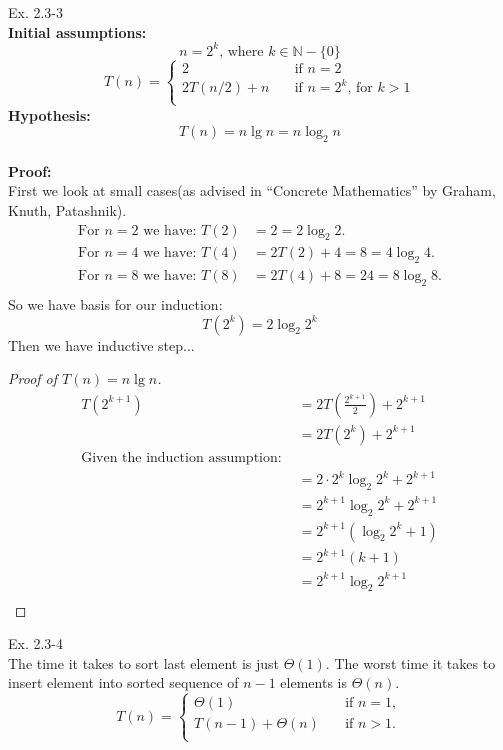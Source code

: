 \documentclass[a4paper,11pt]{exam}
\begin{document}
Ex. 2.3-3 \\
\textbf{Initial assumptions: }
\[
    n = 2^k \text{, where } k \in \mathbb{N} - \{ 0 \} 
\]
\[
    T(n) =
    \begin{cases}
        2               & \quad \text{if } n = 2 \\
        2T(n/2) + n     & \quad \text{if } n = 2^k \text{, for } k > 1 \\
    \end{cases}
\]
\textbf{Hypothesis: }
\[
    T(n) = n \lg n = n \log_2 n
\] \\
\textbf{Proof: } \\
First we look at small cases(as advised in ``Concrete Mathematics'' by  Graham, Knuth, Patashnik).
\[
    \begin{split}
        \text{For } n = 2 \text{ we have: } T(2) &= 2 = 2 \log_2 2. \\
        \text{For } n = 4 \text{ we have: } T(4) &= 2 T \left( 2 \right) + 4 = 8 = 4 \log_2 4. \\
        \text{For } n = 8 \text{ we have: } T(8) &= 2 T \left( 4 \right) + 8 = 24 = 8 \log_2 8. \\
    \end{split}
\]
So we have basis for our induction:
\[
    T \left( 2^k \right) = 2 \log_2 2^k
\]
Then we have inductive step...
\begin{proof}[Proof of \( T(n) = n \lg n \)]
    \[
        \begin{split}
            T(2^{k + 1}) & = 2 T \left( \frac{2^{k + 1}}{2} \right) + 2^{k + 1} \\
            & = 2 T \left( 2^k \right) + 2^{k + 1} \\
            \text{Given the induction assumption: } \\
            & = 2 \cdot 2^k \log_2 2^k + 2^{k + 1} \\
            & = 2^{k + 1} \log_2 2^k + 2^{k + 1} \\
            & = 2^{k + 1} \left( \log_2 2^k + 1 \right) \\
            & = 2^{k + 1} \left( k + 1 \right) \\
            & = 2^{k + 1} \log_2 2^{k + 1}  \\
        \end{split}
    \]
\end{proof}

Ex. 2.3-4 \\
The time it takes to sort last element is just \( \Theta (1) \). The worst time it takes to insert element into sorted sequence of \( n - 1 \) elements is \( \Theta (n) \).
\[
    T(n) = 
    \begin{cases}
        \Theta (1)              & \quad \text{if } n = 1, \\
        T(n - 1) + \Theta (n)   & \quad \text{if } n > 1. \\
    \end{cases}
\]
\end{document}
